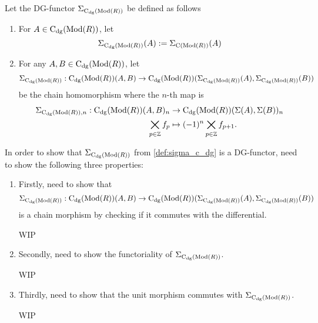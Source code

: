 \begin{definition}
    \label{def:sigma_c_dg}
    Let the DG-functor \( \Sigma_{\operatorname{C}_{\operatorname{dg}}(\operatorname{Mod}(R))} \) be defined as follows
    \begin{enumerate}
        \item {
            For \( A \in \operatorname{C}_{\operatorname{dg}}(\operatorname{Mod}(R)) \), let
            \[
                \Sigma_{\operatorname{C}_{\operatorname{dg}}(\operatorname{Mod}(R))}(A) := \Sigma_{\operatorname{C}(\operatorname{Mod}(R))}(A)
            \]
        }
        \item {
            For any \( A, B \in \operatorname{C}_{\operatorname{dg}}(\operatorname{Mod}(R)) \), let
            \begin{align*}
                \Sigma_{\operatorname{C}_{\operatorname{dg}}(\operatorname{Mod}(R))}: \operatorname{C}_{\operatorname{dg}}(\operatorname{Mod}(R))(A, B) \to \operatorname{C}_{\operatorname{dg}}(\operatorname{Mod}(R))(\Sigma_{\operatorname{C}_{\operatorname{dg}}(\operatorname{Mod}(R))}(A), \Sigma_{\operatorname{C}_{\operatorname{dg}}(\operatorname{Mod}(R))}(B))
            \end{align*}
            be the chain homomorphism where the \( n \)-th map is
            \begin{align*}
                \Sigma_{\operatorname{C}_{\operatorname{dg}}(\operatorname{Mod}(R)), n}: \operatorname{C}_{\operatorname{dg}}(\operatorname{Mod}(R))(A, B)_n &\to \operatorname{C}_{\operatorname{dg}}(\operatorname{Mod}(R))(\Sigma(A), \Sigma(B))_n \\
                \bigtimes_{p \in {\mathbb{Z}}} f_p &\mapsto (-1)^n \bigtimes_{p \in {\mathbb{Z}}} f_{p + 1}.
            \end{align*}
        }
    \end{enumerate}
\end{definition}
\begin{remark}
    In order to show that \( \Sigma_{\operatorname{C}_{\operatorname{dg}}(\operatorname{Mod}(R))} \) from \autoref{def:sigma_c_dg} is a DG-functor, need to show the following three properties:
    \begin{enumerate}
        \item {
            Firstly, need to show that
            \[
                \Sigma_{\operatorname{C}_{\operatorname{dg}}(\operatorname{Mod}(R))}: \operatorname{C}_{\operatorname{dg}}(\operatorname{Mod}(R))(A, B) \to \operatorname{C}_{\operatorname{dg}}(\operatorname{Mod}(R))(\Sigma_{\operatorname{C}_{\operatorname{dg}}(\operatorname{Mod}(R))}(A), \Sigma_{\operatorname{C}_{\operatorname{dg}}(\operatorname{Mod}(R))}(B))
            \]
            is a chain morphism by checking if it commutes with the differential.

            WIP
        }
        \item {
            Secondly, need to show the functoriality of \( \Sigma_{\operatorname{C}_{\operatorname{dg}}(\operatorname{Mod}(R))} \).

            WIP
        }
        \item {
            Thirdly, need to show that the unit morphism commutes with \( \Sigma_{\operatorname{C}_{\operatorname{dg}}(\operatorname{Mod}(R))} \).

            WIP
        }
    \end{enumerate}
\end{remark}

